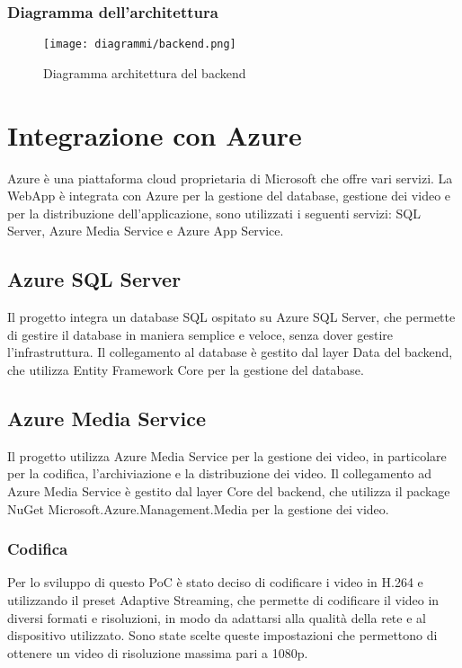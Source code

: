 \subsubsection{Diagramma dell'architettura}
\begin{figure}[H] 
    \centering 
    \texttt{[image: diagrammi/backend.png]} 
    \caption{Diagramma architettura del backend}
\end{figure}
\section{Integrazione con Azure}
Azure è una piattaforma cloud proprietaria di Microsoft che offre vari servizi.
La WebApp è integrata con Azure per la gestione del database, gestione dei video e per la distribuzione dell'applicazione, sono utilizzati i seguenti servizi: SQL Server, Azure Media Service e Azure App Service.\\
\subsection{Azure SQL Server}
Il progetto integra un database SQL ospitato su Azure SQL Server, che permette di gestire il database in maniera semplice e veloce, senza dover gestire l'infrastruttura. Il collegamento al database è gestito dal layer Data del backend, che utilizza Entity Framework Core per la gestione del database.\\
\subsection{Azure Media Service}
Il progetto utilizza Azure Media Service per la gestione dei video, in particolare per la codifica, l'archiviazione e la distribuzione dei video. Il collegamento ad Azure Media Service è gestito dal layer Core del backend, che utilizza il package NuGet Microsoft.Azure.Management.Media per la gestione dei video.\\
\subsubsection{Codifica}
Per lo sviluppo di questo PoC è stato deciso di codificare i video in H.264 e utilizzando il preset Adaptive Streaming, che permette di codificare il video in diversi formati e risoluzioni, in modo da adattarsi alla qualità della rete e al dispositivo utilizzato. Sono state scelte queste impostazioni che permettono di ottenere un video di risoluzione massima pari a 1080p.\\
